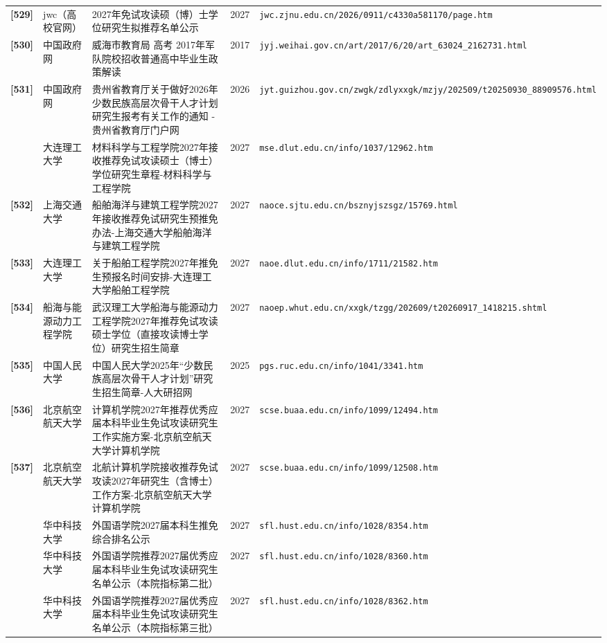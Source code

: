 {\begin{longtable}{@{}p{1.15cm}p{2.9cm}p{6.3cm}p{0.85cm}p{5.0cm}@{}}
\textbf{[529]} & jwc（高校官网） & 2027年免试攻读硕（博）士学位研究生拟推荐名单公示 & 2027 & \texttt{jwc.zjnu.edu.cn/2026/0911/c4330a581170/page.htm} \\
\textbf{[530]} & 中国政府网 & 威海市教育局 高考 2017年军队院校招收普通高中毕业生政策解读 & 2017 & \texttt{jyj.weihai.gov.cn/art/2017/6/20/art\_63024\_2162731.html} \\
\textbf{[531]} & 中国政府网 & 贵州省教育厅关于做好2026年少数民族高层次骨干人才计划研究生报考有关工作的通知 - 贵州省教育厅门户网 & 2026 & \texttt{jyt.guizhou.gov.cn/zwgk/zdlyxxgk/mzjy/202509/t20250930\_88909576.html} \\
[0] & 大连理工大学 & 材料科学与工程学院2027年接收推荐免试攻读硕士（博士）学位研究生章程-材料科学与工程学院 & 2027 & \texttt{mse.dlut.edu.cn/info/1037/12962.htm} \\
\textbf{[532]} & 上海交通大学 & 船舶海洋与建筑工程学院2027年接收推荐免试研究生预推免办法-上海交通大学船舶海洋与建筑工程学院 & 2027 & \texttt{naoce.sjtu.edu.cn/bsznyjszsgz/15769.html} \\
\textbf{[533]} & 大连理工大学 & 关于船舶工程学院2027年推免生预报名时间安排-大连理工大学船舶工程学院 & 2027 & \texttt{naoe.dlut.edu.cn/info/1711/21582.htm} \\
\textbf{[534]} & 船海与能源动力工程学院 & 武汉理工大学船海与能源动力工程学院2027年推荐免试攻读硕士学位（直接攻读博士学位）研究生招生简章 & 2027 & \texttt{naoep.whut.edu.cn/xxgk/tzgg/202609/t20260917\_1418215.shtml} \\
\textbf{[535]} & 中国人民大学 & 中国人民大学2025年“少数民族高层次骨干人才计划”研究生招生简章-人大研招网 & 2025 & \texttt{pgs.ruc.edu.cn/info/1041/3341.htm} \\
\textbf{[536]} & 北京航空航天大学 & 计算机学院2027年推荐优秀应届本科毕业生免试攻读研究生工作实施方案-北京航空航天大学计算机学院 & 2027 & \texttt{scse.buaa.edu.cn/info/1099/12494.htm} \\
\textbf{[537]} & 北京航空航天大学 & 北航计算机学院接收推荐免试攻读2027年研究生（含博士）工作方案-北京航空航天大学计算机学院 & 2027 & \texttt{scse.buaa.edu.cn/info/1099/12508.htm} \\
[0] & 华中科技大学 & 外国语学院2027届本科生推免综合排名公示 & 2027 & \texttt{sfl.hust.edu.cn/info/1028/8354.htm} \\
[0] & 华中科技大学 & 外国语学院推荐2027届优秀应届本科毕业生免试攻读研究生名单公示（本院指标第二批） & 2027 & \texttt{sfl.hust.edu.cn/info/1028/8360.htm} \\
[0] & 华中科技大学 & 外国语学院推荐2027届优秀应届本科毕业生免试攻读研究生名单公示（本院指标第三批） & 2027 & \texttt{sfl.hust.edu.cn/info/1028/8362.htm} \\

\end{longtable}}
